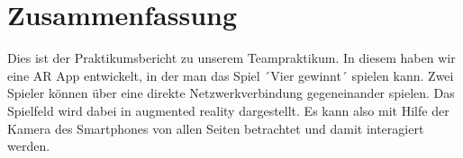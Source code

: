 \section{Zusammenfassung}
Dies ist der Praktikumsbericht zu unserem Teampraktikum. In diesem haben wir
eine AR App entwickelt, in der man das Spiel ´Vier gewinnt´ spielen kann. Zwei Spieler
können über eine direkte Netzwerkverbindung gegeneinander spielen.
Das Spielfeld wird dabei in augmented reality dargestellt. Es kann also mit Hilfe der Kamera
des Smartphones von allen Seiten betrachtet und damit interagiert werden.
